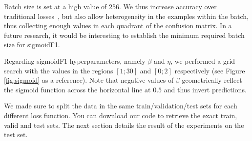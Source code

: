 Batch size is set at a high value of 256. We thus increase accuracy over traditional losses~\cite{bigBS}, but also allow heterogeneity in the examples within the batch, thus collecting enough values in  each quadrant of the confusion matrix. In a future research, it would be interesting to establish the minimum required batch size for sigmoidF1.

Regarding sigmoidF1 hyperparameters, namely $\beta$ and $\eta$, we performed a grid search with the values in the regions $[1;30]$ and $[0;2]$ respectively (see Figure \ref{fig:sigmoid} as a reference). Note that negative values of $\beta$ geometrically reflect the sigmoid function across the horizontal line at $0.5$ and thus invert predictions.

We made sure to split the data in the same train/validation/test sets for each different loss function. You can download our code to retrieve the exact train, valid and test sets. The next section details the result of the experiments on the test set.








